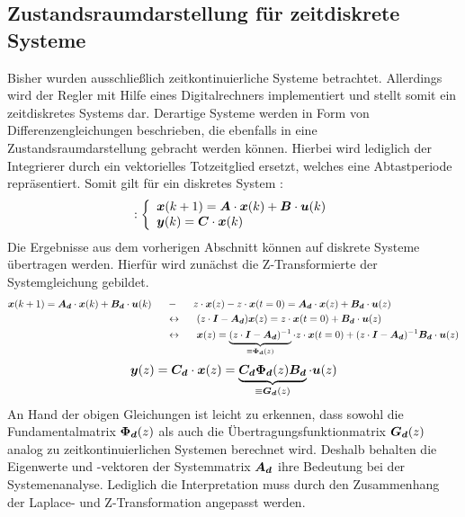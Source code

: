 \subsection{Zustandsraumdarstellung für zeitdiskrete Systeme}
Bisher wurden ausschließlich zeitkontinuierliche Systeme betrachtet. Allerdings wird der Regler mit Hilfe eines Digitalrechners implementiert und stellt somit ein zeitdiskretes Systems dar. Derartige Systeme werden in Form von Differenzengleichungen beschrieben, die ebenfalls in eine Zustandsraumdarstellung gebracht werden können. Hierbei wird lediglich der Integrierer durch ein vektorielles Totzeitglied ersetzt, welches eine Abtastperiode repräsentiert. Somit gilt für ein diskretes System :
\begin{equation}
: \left\{ \begin{array}{ll}
\boldsymbol{{x}}(k+1) = \boldsymbol{A}\cdot \boldsymbol{x}(k) + \boldsymbol{B}\cdot \boldsymbol{u}(k) \\
\boldsymbol{y}(k) = \boldsymbol{C}\cdot \boldsymbol{x}(k)
\end{array}
\right.
\label{eq_discrete_ss}
\end{equation}
Die Ergebnisse aus dem vorherigen Abschnitt können auf diskrete Systeme übertragen werden. Hierfür wird zunächst die Z-Transformierte der Systemgleichung gebildet.
\begin{equation}
\begin{split}
\boldsymbol{x}(k+1) = \boldsymbol{A_d}\cdot \boldsymbol{x}(k)+\boldsymbol{B_d}\cdot \boldsymbol{u}(k) &\hspace{15pt} - \hspace{15pt} z\cdot \boldsymbol{x}(z)-z\cdot \boldsymbol{x}(t=0) = \boldsymbol{A_d}\cdot \boldsymbol{x}(z) + \boldsymbol{B_d}\cdot \boldsymbol{u}(z)
\\
&\hspace{15pt}\leftrightarrow\hspace{15pt}
(z\cdot\boldsymbol{I}-\boldsymbol{A_d})\boldsymbol{x}(z) = z\cdot \boldsymbol{x}(t=0)+\boldsymbol{B_d}\cdot \boldsymbol{u}(z)
\\
&\hspace{15pt}\leftrightarrow\hspace{15pt}
\boldsymbol{x}(z) = \underbrace{(z\cdot\boldsymbol{I}-\boldsymbol{A_d})^{-1}}_{\equiv \boldsymbol{\Phi_d}(z)}\cdot z\cdot \boldsymbol{x}(t=0) + (z\cdot \boldsymbol{I}-\boldsymbol{A_d})^{-1}\boldsymbol{B_d}\cdot \boldsymbol{u}(z)
\end{split}
\end{equation}
\begin{equation}
\boldsymbol{y}(z) = \boldsymbol{C_d}\cdot \boldsymbol{x}(z) = \underbrace{\boldsymbol{C_d}\boldsymbol{\Phi_d}(z)\boldsymbol{B_d}}_{\equiv \boldsymbol{G_d}(z)}\cdot \boldsymbol{u}(z)
\end{equation}
An Hand der obigen Gleichungen ist leicht zu erkennen, dass sowohl die Fundamentalmatrix $\boldsymbol{\Phi_d}(z)$ als auch die Übertragungsfunktionmatrix $\boldsymbol{G_d}(z)$ analog zu zeitkontinuierlichen Systemen berechnet wird. Deshalb behalten die Eigenwerte und -vektoren der Systemmatrix $\boldsymbol{A_d}$ ihre Bedeutung bei der Systemenanalyse. Lediglich die Interpretation muss durch den Zusammenhang der Laplace- und Z-Transformation angepasst werden.
